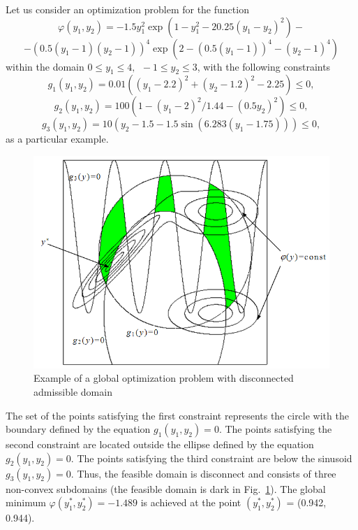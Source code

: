 Let us consider an optimization problem  for the function
\begin{displaymath}
\varphi(y_1,y_2)=-1.5y_1^2\exp(1-y_1^2-20.25(y_1-y_2)^2)-
\end{displaymath}
\begin{displaymath}
-(0.5(y_1-1)(y_2-1))^4\exp(2-(0.5(y_1-1))^4-(y_2-1)^4)
\end{displaymath}
within the domain $0 \leq y_1\leq 4,\ \  -1\leq y_2\leq 3$, with the following constraints 
\begin{displaymath}
g_1(y_1,y_2)=0.01((y_1-2.2)^2+(y_2-1.2)^2-2.25)\leq 0,
\end{displaymath}
\begin{displaymath}
g_2(y_1,y_2)=100(1-(y_1-2)^2/1.44-(0.5y_2)^2)\leq 0,
\end{displaymath}
\begin{displaymath}
g_3(y_1,y_2)=10(y_2-1.5-1.5\sin(6.283(y_1-1.75)))\leq 0,
\end{displaymath}
as a particular example.

\begin{figure}[t]
\includegraphics[width=0.7\linewidth]{figures/figure1_1.png}
\caption{Example of a global optimization problem with disconnected admissible domain}
\label{1_fig_1}    
\end{figure}

The set of the points satisfying the first constraint represents the circle with the boundary defined by the equation $g_1(y_1,y_2)=0$. The points satisfying the second constraint are located outside the ellipse defined by the equation $g_2(y_1,y_2)=0$. The points satisfying the third constraint are below the sinusoid $g_3(y_1,y_2)=0$. Thus, the feasible domain is disconnect and consists of three non-convex subdomains (the feasible domain is dark in Fig.~\ref{1_fig_1}). The global minimum $\varphi(y_1^*,y_2^*)=-1.489$  is achieved at the point $(y_1^*,y_2^*)$  = (0.942, 0.944).

